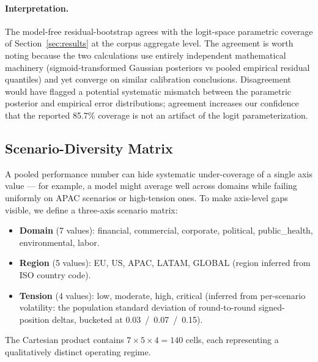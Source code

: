 \documentclass[12pt]{article}
\begin{document}
\paragraph{Interpretation.} The model-free residual-bootstrap agrees with the logit-space parametric coverage of Section~\ref{sec:results} at the corpus aggregate level. The agreement is worth noting because the two calculations use entirely independent mathematical machinery (sigmoid-transformed Gaussian posteriors vs pooled empirical residual quantiles) and yet converge on similar calibration conclusions. Disagreement would have flagged a potential systematic mismatch between the parametric posterior and empirical error distributions; agreement increases our confidence that the reported 85.7\% coverage is not an artifact of the logit parameterization.

\subsection{Scenario-Diversity Matrix}
\label{sec:matrix}

A pooled performance number can hide systematic under-coverage of a single axis value --- for example, a model might average well across domains while failing uniformly on APAC scenarios or high-tension ones. To make axis-level gaps visible, we define a three-axis scenario matrix:

\begin{itemize}
    \item \textbf{Domain} (7 values): financial, commercial, corporate, political, public\_health, environmental, labor.
    \item \textbf{Region} (5 values): EU, US, APAC, LATAM, GLOBAL (region inferred from ISO country code).
    \item \textbf{Tension} (4 values): low, moderate, high, critical (inferred from per-scenario volatility: the population standard deviation of round-to-round signed-position deltas, bucketed at 0.03~/~0.07~/~0.15).
\end{itemize}

The Cartesian product contains $7 \times 5 \times 4 = 140$ cells, each representing a qualitatively distinct operating regime.
\end{document}
